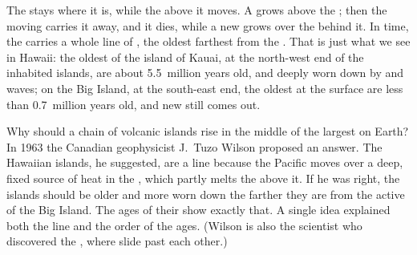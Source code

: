 The  stays where it is, while the  above it moves. A 
grows above the ; then the moving  carries it away, and it
dies, while a new  grows over the  behind it. In time, the
 carries a whole line of , the oldest farthest from the
. That is just what we see in Hawaii: the oldest  of the
island of Kauai, at the north-west end of the inhabited islands, are about
5.5~million years old, and deeply worn down by  and waves; on the Big
Island, at the south-east end, the oldest  at the surface are less
than 0.7~million years old, and new  still comes out.

\begin{history}
Why should a chain of volcanic islands rise in the middle of the largest
 on Earth? In 1963 the Canadian geophysicist J.~Tuzo Wilson proposed
an answer. The Hawaiian islands, he suggested, are a line because the
Pacific  moves over a deep, fixed source of heat in the , which
partly melts the  above it. If he was right, the islands should be
older and more worn down the farther they are from the active  of
the Big Island. The ages of their  show exactly that. A single idea explained both the line and the order of the ages.
(Wilson is also the scientist who discovered the ,
where  slide past each other.)
\end{history}

